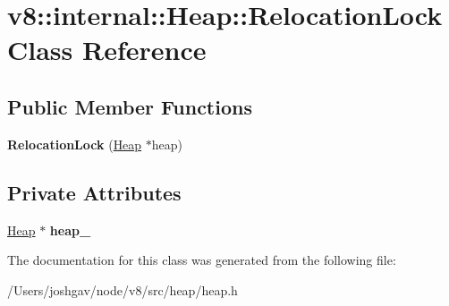 \hypertarget{classv8_1_1internal_1_1_heap_1_1_relocation_lock}{}\section{v8\+:\+:internal\+:\+:Heap\+:\+:Relocation\+Lock Class Reference}
\label{classv8_1_1internal_1_1_heap_1_1_relocation_lock}
\subsection*{Public Member Functions}
\begin{DoxyCompactItemize}
\item 
{\bfseries Relocation\+Lock} (\hyperlink{classv8_1_1internal_1_1_heap}{Heap} $\ast$heap)\hypertarget{classv8_1_1internal_1_1_heap_1_1_relocation_lock_a4941fd02d0db7a0d4592bb68a2dcc4e4}{}\label{classv8_1_1internal_1_1_heap_1_1_relocation_lock_a4941fd02d0db7a0d4592bb68a2dcc4e4}

\end{DoxyCompactItemize}
\subsection*{Private Attributes}
\begin{DoxyCompactItemize}
\item 
\hyperlink{classv8_1_1internal_1_1_heap}{Heap} $\ast$ {\bfseries heap\+\_\+}\hypertarget{classv8_1_1internal_1_1_heap_1_1_relocation_lock_a1456fbe5072250442ad00eb4160e9a85}{}\label{classv8_1_1internal_1_1_heap_1_1_relocation_lock_a1456fbe5072250442ad00eb4160e9a85}

\end{DoxyCompactItemize}


The documentation for this class was generated from the following file\+:\begin{DoxyCompactItemize}
\item 
/\+Users/joshgav/node/v8/src/heap/heap.\+h\end{DoxyCompactItemize}
